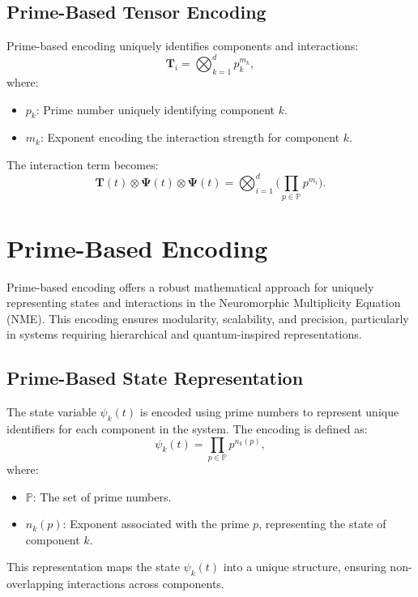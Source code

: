 \documentclass{article}
\theoremstyle{plain}
\begin{document}
\subsection{Prime-Based Tensor Encoding}
Prime-based encoding uniquely identifies components and interactions:
\begin{equation}
\bm{T}_i = \bigotimes_{k=1}^d p_k^{m_k},
\end{equation}
where:
\begin{itemize}
    \item \(p_k\): Prime number uniquely identifying component \(k\).
    \item \(m_k\): Exponent encoding the interaction strength for component \(k\).
\end{itemize}
The interaction term becomes:
\begin{equation}
\bm{T}(t) \otimes \bm{\Psi}(t) \otimes \bm{\Psi}(t) = \bigotimes_{i=1}^d \bigg( \prod_{p \in \mathbb{P}} p^{m_i} \bigg).
\end{equation}

\section{Prime-Based Encoding}

Prime-based encoding offers a robust mathematical approach for uniquely representing states and interactions in the Neuromorphic Multiplicity Equation (NME). This encoding ensures modularity, scalability, and precision, particularly in systems requiring hierarchical and quantum-inspired representations.

\subsection{Prime-Based State Representation}
The state variable \(\psi_k(t)\) is encoded using prime numbers to represent unique identifiers for each component in the system. The encoding is defined as:
\begin{equation}
\psi_k(t) = \prod_{p \in \mathbb{P}} p^{n_k(p)},
\end{equation}
where:
\begin{itemize}
    \item \(\mathbb{P}\): The set of prime numbers.
    \item \(n_k(p)\): Exponent associated with the prime \(p\), representing the state of component \(k\).
\end{itemize}

This representation maps the state \(\psi_k(t)\) into a unique structure, ensuring non-overlapping interactions across components.
\end{document}
